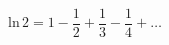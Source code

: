 \documentclass[12pt]{article}
\begin{document}
\sicpsize
\[
\text{ln} \, 2 = 1 - \frac{1}{2} + \frac{1}{3} - \frac{1}{4} + \dots
\]
\end{document}
